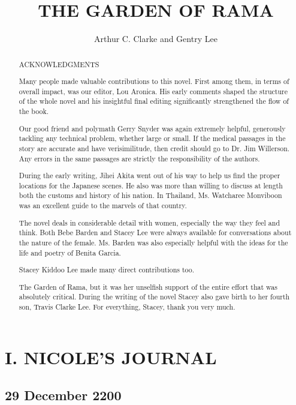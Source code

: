 \documentclass[]{article}
\title{THE GARDEN OF RAMA}
\author{Arthur C.  Clarke and Gentry Lee}
\begin{document}
\maketitle

\begin{abstract}
ACKNOWLEDGMENTS

Many people made valuable contributions to this novel.  First among them, in terms of overall impact, was our editor, Lou Aronica.  His early comments shaped the structure of the whole novel and his insightful final editing significantly strengthened the flow of the book.

Our good friend and polymath Gerry Snyder was again extremely helpful, generously tackling any technical problem, whether large or small.  If the medical passages in the story are accurate and have verisimilitude, then credit should go to Dr.  Jim Willerson.  Any errors in the same passages are strictly the responsibility of the authors.

During the early writing, Jihei Akita went out of his way to help us find the proper locations for the Japanese scenes.  He also was more than willing to discuss at length both the customs and history of his nation.  In Thailand, Ms.  Watcharee Monviboon was an excellent guide to the marvels of that country.

The novel deals in considerable detail with women, especially the way they feel and think.  Both Bebe Barden and Stacey Lee were always available for conversations about the nature of the female.  Ms.  Barden was also especially helpful with the ideas for the life and poetry of Benita Garcia.

Stacey Kiddoo Lee made many direct contributions too.

The Garden of Rama, but it was her unselfish support of the entire effort that was absolutely critical.  During the writing of the novel Stacey also gave birth to her fourth son, Travis Clarke Lee.  For everything, Stacey, thank you very much.


\end{abstract}

\newpage


\section*{I.  NICOLE’S JOURNAL}
\subsection*{29 December 2200}
\end{document}

